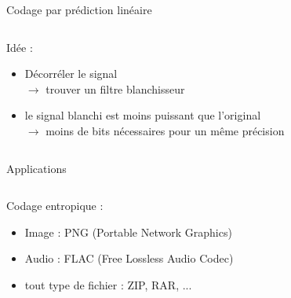\documentclass[9pt, aspectratio=169]{beamer}
\begin{document}
\begin{frame}{Codage par prédiction linéaire} %

\begin{columns}
   \begin{column}{0.6\textwidth}

        Idée :
        \begin{itemize}
            \item Décorréler le signal\\
            $\rightarrow$ trouver un filtre \og blanchisseur \fg{}
            \item le signal \og blanchi \fg{} est moins puissant que l'original \\
            $\rightarrow$ moins de bits nécessaires pour un même précision
        \end{itemize}
        
   \end{column}
   \begin{column}{0.39\textwidth}
		
   \end{column}
\end{columns}
\end{frame}

\begin{frame}{Applications} %
\begin{columns}
   \begin{column}{0.6\textwidth}
		Codage entropique :
        \begin{itemize}
            \item Image : PNG (Portable Network Graphics)
            \item Audio : FLAC (Free Lossless Audio Codec)
            \item tout type de fichier : ZIP, RAR, ...
        \end{itemize}
        
   \end{column}
   \begin{column}{0.39\textwidth}
		
   \end{column}
\end{columns}
\end{frame}


\end{document}
